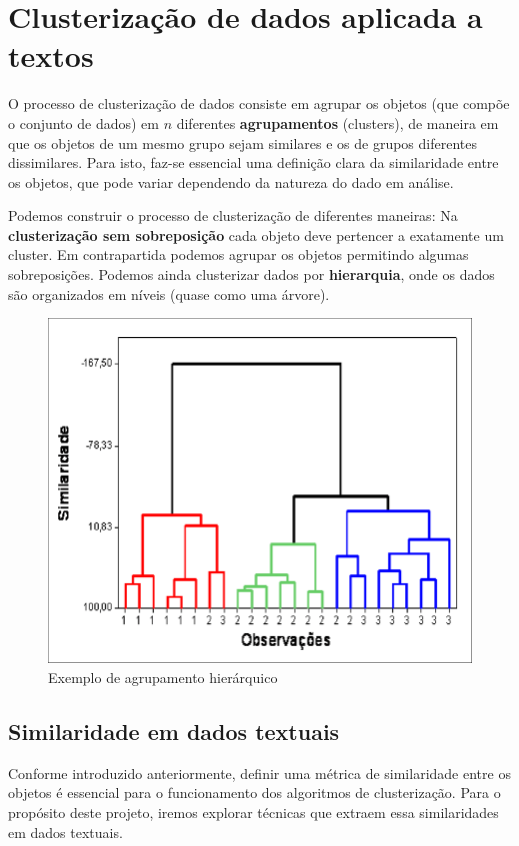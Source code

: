 
 \chapter{Clusterização de dados aplicada a textos}
 
 O processo de clusterização de dados consiste em agrupar os objetos (que compõe o conjunto de dados) em $n$ diferentes \textbf{agrupamentos} (clusters), de maneira em que os objetos de um mesmo grupo sejam similares e os de grupos diferentes dissimilares.
 Para isto, faz-se essencial uma definição clara da similaridade entre os objetos, que pode variar dependendo da natureza do dado em análise.
 
 Podemos construir o processo de clusterização de diferentes maneiras: Na \textbf{clusterização sem sobreposição} cada objeto deve pertencer a exatamente um cluster. 
 Em contrapartida podemos agrupar os objetos permitindo algumas sobreposições. 
 Podemos ainda clusterizar dados por \textbf{hierarquia}, onde os dados são organizados em níveis (quase como uma árvore).
 
 \begin{figure}[H]
   \centering
   \includegraphics[scale=0.50]{figs/cluster_h.png}
    \caption{Exemplo de agrupamento hierárquico}
    \label{fig:clusterh}
 \end{figure}
 
 \pagebreak
 
 \section{Similaridade em dados textuais}
 Conforme introduzido anteriormente, definir uma métrica de similaridade entre os objetos é essencial para o funcionamento dos algoritmos de clusterização.
 Para o propósito deste projeto, iremos explorar técnicas que extraem essa similaridades em dados textuais.
 
